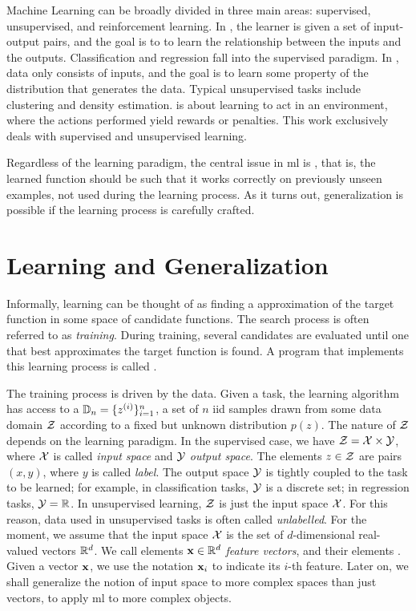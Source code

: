 Machine Learning can be broadly divided in three main areas: supervised, unsupervised, and reinforcement learning. In , the learner is given a set of input-output pairs, and the goal is to to learn the relationship between the inputs and the outputs. Classification and regression fall into the supervised paradigm. In , data only consists of inputs, and the goal is to learn some property of the distribution that generates the data. Typical unsupervised tasks include clustering and density estimation.  is about learning to act in an environment, where the actions performed yield rewards or penalties. This work exclusively deals with supervised and unsupervised learning. 

Regardless of the learning paradigm, the central issue in \gls{ml} is , that is, the learned function should be such that it works correctly on previously unseen examples, not used during the learning process. As it turns out, generalization is possible if the learning process is carefully crafted.

\section{Learning and Generalization}\label{sec:learning}
Informally, learning can be thought of as finding a  approximation of the target function in some space of candidate functions. The search process is often referred to as \emph{training}. During training, several candidates are evaluated until one that best approximates the target function is found. A program that implements this learning process is called .

The training process is driven by the data. Given a task, the learning algorithm has access to a  $\mathbb{D}_n = \{ z^{(i)} \}_{i=1}^n$, a set of $n$ \gls{iid} samples drawn from some data domain $\Cal{Z}$ according to a fixed but unknown distribution $p(z)$. The nature of $\Cal{Z}$ depends on the learning paradigm. In the supervised case, we have $\Cal{Z} = \Cal{X} \times \Cal{Y}$, where $\Cal{X}$ is called \emph{input space} and $\Cal{Y}$ \emph{output space}. The elements $z \in \Cal{z}$ are pairs $(x, y)$, where $y$ is called \emph{label}. The output space $\Cal{Y}$ is tightly coupled to the task to be learned; for example, in classification tasks, $\Cal{Y}$ is a discrete set; in regression tasks, $\Cal{Y} = \Real$. In unsupervised learning, $\Cal{Z}$ is just the input space $\Cal{X}$. For this reason, data used in unsupervised tasks is often called \emph{unlabelled}. For the moment, we assume that the input space $\Cal{X}$ is the set of $d$-dimensional real-valued vectors $\mathbb{R}^d$. We call elements $\Vector{x} \in \Real^d$  \emph{feature vectors}, and their elements . Given a vector $\Vector{x}$, we use the notation $\Vector{x}_i$ to indicate its $i$-th feature. Later on, we shall generalize the notion of input space to more complex spaces than just vectors, to apply \gls{ml} to more complex objects.

